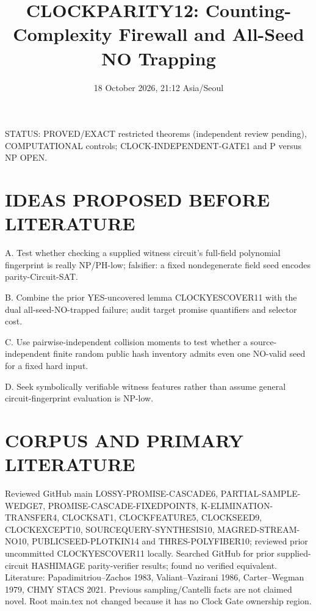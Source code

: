 \documentclass[11pt]{article}
\title{CLOCKPARITY12: Counting-Complexity Firewall and All-Seed NO Trapping}
\date{18 October 2026, 21:12 Asia/Seoul}
\begin{document}
\maketitle
\noindent STATUS: PROVED/EXACT restricted theorems (independent review pending), COMPUTATIONAL controls; CLOCK-INDEPENDENT-GATE1 and P versus NP OPEN.

\section*{IDEAS PROPOSED BEFORE LITERATURE}
\item[] A. Test whether checking a supplied witness circuit's full-field polynomial fingerprint is really NP/PH-low; falsifier: a fixed nondegenerate field seed encodes parity-Circuit-SAT.
\item[] B. Combine the prior YES-uncovered lemma CLOCKYESCOVER11 with the dual all-seed-NO-trapped failure; audit target promise quantifiers and selector cost.
\item[] C. Use pairwise-independent collision moments to test whether a source-independent finite random public hash inventory admits even one NO-valid seed for a fixed hard input.
\item[] D. Seek symbolically verifiable witness features rather than assume general circuit-fingerprint evaluation is NP-low.

\section*{CORPUS AND PRIMARY LITERATURE}
Reviewed GitHub main LOSSY-PROMISE-CASCADE6, PARTIAL-SAMPLE-WEDGE7, PROMISE-CASCADE-FIXEDPOINT8, K-ELIMINATION-TRANSFER4, CLOCKSAT1, CLOCKFEATURE5, CLOCKSEED9, CLOCKEXCEPT10, SOURCEQUERY-SYNTHESIS10, MAGRED-STREAM-NO10, PUBLICSEED-PLOTKIN14 and THRES-POLYFIBER10; reviewed prior uncommitted CLOCKYESCOVER11 locally. Searched GitHub for prior supplied-circuit HASHIMAGE parity-verifier results; found no verified equivalent. Literature: Papadimitriou--Zachos 1983, Valiant--Vazirani 1986, Carter--Wegman 1979, CHMY STACS 2021. Previous sampling/Cantelli facts are not claimed novel. Root main.tex not changed because it has no Clock Gate ownership region.
\end{document}
